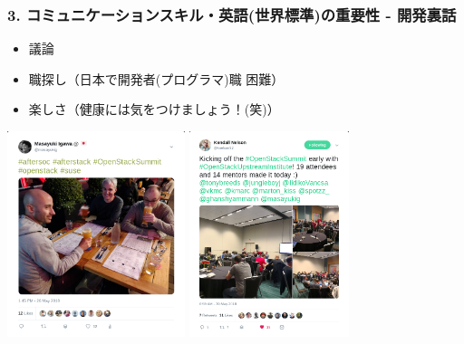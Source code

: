 \documentclass[aspectratio=169,11pt,hyperref={colorlinks=true}]{beamer}
\begin{document}
\begin{frame}
  \frametitle{3. コミュニケーションスキル・英語(世界標準)の重要性 - 開発裏話}
  \begin{itemize}
    \item 議論
    \item 職探し（日本で開発者(プログラマ)職 困難）
    \item 楽しさ（健康には気をつけましょう！(笑)）
  \end{itemize}
  \centering\includegraphics[height=60mm]{images/tweet-suse.png}
  \centering\includegraphics[height=60mm]{images/tweet-oui.png}
\end{frame}
\end{document}
